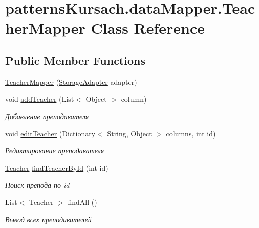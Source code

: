\hypertarget{classpatterns_kursach_1_1data_mapper_1_1_teacher_mapper}{}\section{patterns\+Kursach.\+data\+Mapper.\+Teacher\+Mapper Class Reference}
\label{classpatterns_kursach_1_1data_mapper_1_1_teacher_mapper}
\subsection*{Public Member Functions}
\begin{DoxyCompactItemize}
\item 
\mbox{\hyperlink{classpatterns_kursach_1_1data_mapper_1_1_teacher_mapper_a60e92914b1886a5f084f894850fa339d}{Teacher\+Mapper}} (\mbox{\hyperlink{classpatterns_kursach_1_1_storage_adapter}{Storage\+Adapter}} adapter)
\item 
void \mbox{\hyperlink{classpatterns_kursach_1_1data_mapper_1_1_teacher_mapper_adf54d72dc8d837244868aacc3cd2c3a3}{add\+Teacher}} (List$<$ Object $>$ column)
\begin{DoxyCompactList}\small\item\em Добавление преподавателя \end{DoxyCompactList}\item 
void \mbox{\hyperlink{classpatterns_kursach_1_1data_mapper_1_1_teacher_mapper_aecb5c0f2f2a2bad763f94cb67f27ba07}{edit\+Teacher}} (Dictionary$<$ String, Object $>$ columns, int id)
\begin{DoxyCompactList}\small\item\em Редактирование преподавателя \end{DoxyCompactList}\item 
\mbox{\hyperlink{classpatterns_kursach_1_1_teacher}{Teacher}} \mbox{\hyperlink{classpatterns_kursach_1_1data_mapper_1_1_teacher_mapper_aa492e2548aa549c1546cd4fe580d684f}{find\+Teacher\+By\+Id}} (int id)
\begin{DoxyCompactList}\small\item\em Поиск препода по id \end{DoxyCompactList}\item 
List$<$ \mbox{\hyperlink{classpatterns_kursach_1_1_teacher}{Teacher}} $>$ \mbox{\hyperlink{classpatterns_kursach_1_1data_mapper_1_1_teacher_mapper_ab8781a447f8b22a0ed6a5c52220465be}{find\+All}} ()
\begin{DoxyCompactList}\small\item\em Вывод всех преподавателей \end{DoxyCompactList}\item 

\end{DoxyCompactItemize}
